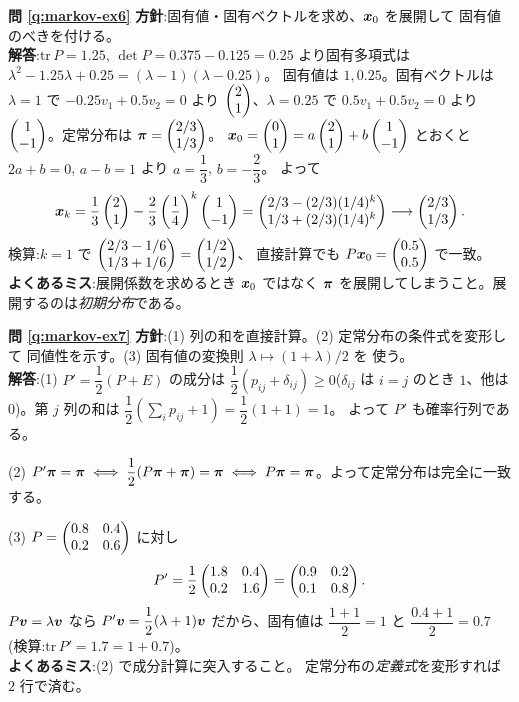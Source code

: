\bigskip
\noindent\textbf{問 \ref{q:markov-ex6}}\quad
\textbf{方針}:固有値・固有ベクトルを求め、$\bm{x}_0$ を展開して
固有値のべきを付ける。\\
\textbf{解答}:$\mathrm{tr}\,P = 1.25$, $\det P = 0.375 - 0.125 = 0.25$
より固有多項式は
$\lambda^2 - 1.25\lambda + 0.25 = (\lambda - 1)(\lambda - 0.25)$。
固有値は $1, 0.25$。固有ベクトルは $\lambda = 1$ で
$-0.25v_1 + 0.5v_2 = 0$ より $\begin{pmatrix}2 \\ 1\end{pmatrix}$、$\lambda = 0.25$ で
$0.5v_1 + 0.5v_2 = 0$ より $\begin{pmatrix}1 \\ -1\end{pmatrix}$。定常分布は
$\bm{\pi} = \begin{pmatrix}2/3 \\ 1/3\end{pmatrix}$。
$\bm{x}_0 = \begin{pmatrix}0 \\ 1\end{pmatrix} = a\begin{pmatrix}2 \\ 1\end{pmatrix} + b\begin{pmatrix}1 \\ -1\end{pmatrix}$ とおくと
$2a + b = 0$, $a - b = 1$ より $a = \dfrac{1}{3}$, $b = -\dfrac{2}{3}$。
よって
\[
\bm{x}_k = \frac{1}{3}\begin{pmatrix}2 \\ 1\end{pmatrix}
- \frac{2}{3}\left(\frac{1}{4}\right)^k \begin{pmatrix}1 \\ -1\end{pmatrix}
= \begin{pmatrix}2/3 - (2/3)(1/4)^k \\ 1/3 + (2/3)(1/4)^k\end{pmatrix}
\longrightarrow \begin{pmatrix}2/3 \\ 1/3\end{pmatrix}.
\]
検算:$k = 1$ で $\begin{pmatrix}2/3 - 1/6 \\ 1/3 + 1/6\end{pmatrix} = \begin{pmatrix}1/2 \\ 1/2\end{pmatrix}$、
直接計算でも $P\bm{x}_0 = \begin{pmatrix}0.5 \\ 0.5\end{pmatrix}$ で一致。\\
\textbf{よくあるミス}:展開係数を求めるとき $\bm{x}_0$ ではなく
$\bm{\pi}$ を展開してしまうこと。展開するのは\emph{初期分布}である。

\bigskip
\noindent\textbf{問 \ref{q:markov-ex7}}\quad
\textbf{方針}:(1) 列の和を直接計算。(2) 定常分布の条件式を変形して
同値性を示す。(3) 固有値の変換則 $\lambda \mapsto (1 + \lambda)/2$ を
使う。\\
\textbf{解答}:(1) $P' = \dfrac{1}{2}(P + E)$ の成分は
$\dfrac{1}{2}(p_{ij} + \delta_{ij}) \ge 0$($\delta_{ij}$ は
$i = j$ のとき $1$、他は $0$)。第 $j$ 列の和は
$\dfrac{1}{2}\left(\sum_i p_{ij} + 1\right) = \dfrac{1}{2}(1 + 1) = 1$。
よって $P'$ も確率行列である。

(2) $P'\bm{\pi} = \bm{\pi}
\iff \dfrac{1}{2}(P\bm{\pi} + \bm{\pi}) = \bm{\pi}
\iff P\bm{\pi} = \bm{\pi}$。よって定常分布は完全に一致する。

(3) $P = \begin{pmatrix}0.8 & 0.4 \\ 0.2 & 0.6\end{pmatrix}$ に対し
\[
P' = \frac{1}{2}\begin{pmatrix}1.8 & 0.4 \\ 0.2 & 1.6\end{pmatrix} = \begin{pmatrix}0.9 & 0.2 \\ 0.1 & 0.8\end{pmatrix}.
\]
$P\bm{v} = \lambda\bm{v}$ なら
$P'\bm{v} = \dfrac{1}{2}(\lambda + 1)\bm{v}$ だから、固有値は
$\dfrac{1 + 1}{2} = 1$ と $\dfrac{0.4 + 1}{2} = 0.7$
(検算:$\mathrm{tr}\,P' = 1.7 = 1 + 0.7$)。\\
\textbf{よくあるミス}:(2) で成分計算に突入すること。
定常分布の\emph{定義式}を変形すれば $2$ 行で済む。

